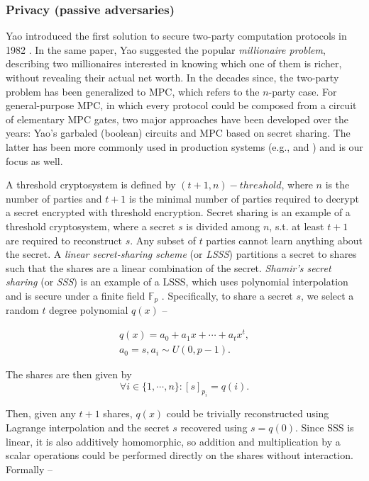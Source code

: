 \documentclass{article} \usepackage{nips13submit_e,times}
\begin{document}
\subsubsection{Privacy (passive adversaries)}

Yao introduced the first solution to secure two-party computation protocols in 1982 \cite{yao82}. In the same paper, Yao suggested the popular \textit{millionaire problem}, describing two millionaires interested in knowing which one of them is richer, without revealing their actual net worth. In the decades since, the two-party problem has been generalized to MPC, which refers to the $n$-party case. For general-purpose MPC, in which every protocol could be composed from a circuit of elementary MPC gates, two major approaches have been developed over the years: Yao's garbaled (boolean) circuits \cite{fairplaymp} and MPC based on secret sharing. The latter has been more commonly used in production systems (e.g., \cite{sharemind} and \cite{viff}) and is our focus as well.

A threshold cryptosystem is defined by $(t+1,n)-threshold$, where $n$ is the number of parties and $t+1$ is the minimal number of parties required to decrypt a secret encrypted with threshold encryption. Secret sharing is an example of a threshold cryptosystem, where a secret $s$ is divided among $n$, s.t. at least $t+1$ are required to reconstruct $s$. Any subset of $t$ parties cannot learn anything about the secret. A \textit{linear secret-sharing scheme} (or \textit{LSSS}) partitions a secret to shares such that the shares are a linear combination of the secret. \textit{Shamir's secret sharing} (or \textit{SSS}) is an example of a LSSS, which uses polynomial interpolation and is secure under a finite field $\mathbb{F}_p$ \cite{shamir}. Specifically, to share a secret $s$, we select a random $t$ degree polynomial $q(x)$ --

\begin{eqnarray}
	q(x) = a_0 + a_1 x + \cdots + a_{t} x^{t},\\
	a_0 = s, a_i \sim U(0,p-1).
\end{eqnarray}

The shares are then given by 
\begin{equation}
	\forall i \in \{ 1, \cdots, n \}: [s]_{p_i} = q(i).
\end{equation}

Then, given any $t+1$ shares, $q(x)$ could be trivially reconstructed using Lagrange interpolation and the secret $s$ recovered using $s = q(0)$. Since SSS is linear, it is also additively homomorphic, so addition and multiplication by a scalar operations could be performed directly on the shares without interaction. Formally --
\end{document}
